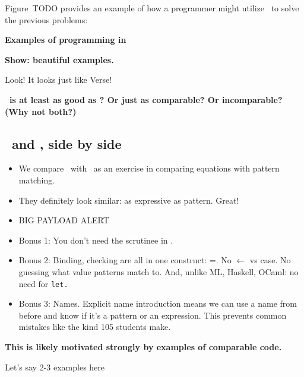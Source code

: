 \documentclass[manuscript,screen,review, 12pt, nonacm]{acmart}
\begin{document}
    Figure~TODO provides an example of how a programmer might utilize
    \VMinus\ to solve the previous problems: 
    
    \bf{Examples of programming in \VMinus }
    
    \bf{Show: beautiful examples. }
    
    Look! It looks just like Verse! 
   
    \bf{\VMinus\ is at least as good as \PPlus? Or just as comparable? }
        Or incomparable? (Why not both?)
    
    \subsection{\VMinus\ and \PPlus, side by side}

    \begin{itemize}
        \item We compare \VMinus\ with \PPlus\ as an exercise in comparing
        equations with pattern matching. 
        \item They definitely look similar: as expressive as pattern. Great! 
        \item{BIG PAYLOAD ALERT}
        \item Bonus 1: You don't need the scrutinee in \VMinus. 
        \item Bonus 2: Binding, checking are all in one construct: =. No
                $\leftarrow$ vs case. No guessing what value patterns match to. 
                And, unlike ML, Haskell, OCaml: no need for \tt{let}.
        \item Bonus 3: Names. Explicit name introduction means we can use a name
        from before and know if it's a pattern or an expression. This prevents
        common mistakes like the kind 105 students make. 
    \end{itemize}
    

    \bf{\bf{This is likely motivated strongly by examples of comparable code.}}

    Let's say 2-3 examples here


\bigskip
\end{document}
